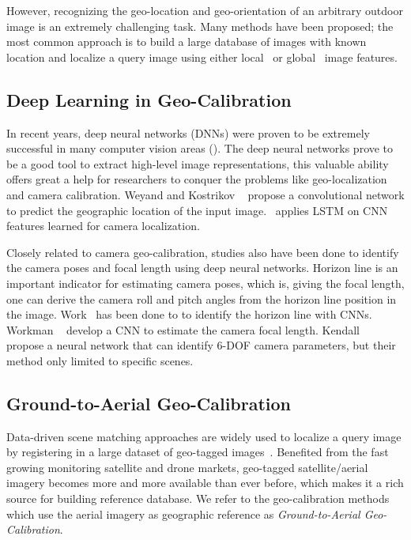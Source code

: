 However, recognizing the geo-location and geo-orientation of an
arbitrary outdoor image is an extremely challenging task.  Many
methods have been proposed; the most common approach is to build a
large database of images with known location and localize a query
image using either local~\cite{li2010location,schindler2008detecting}
or global~\cite{hays2008im2gps,doersch2012what} image features. 


\subsection{Deep Learning in Geo-Calibration}
In recent years, deep neural networks (DNNs) were proven to be
extremely successful in many computer vision areas (). 
The deep neural networks prove to be a good tool to extract high-level
image representations, this valuable ability offers great a help for
researchers to conquer the problems like geo-localization and camera
calibration.
Weyand and Kostrikov \etal~\cite{planet} propose a convolutional
network to predict the geographic location of the input
image.~\cite{walch2017image} applies LSTM on CNN features learned for
camera localization.

Closely related to camera geo-calibration, studies also have been done
to identify the camera poses and focal length using deep neural
networks.
Horizon line is an important indicator for estimating camera poses,
which is, giving the focal length, one can derive the camera roll and
pitch angles from the horizon line position in the image.
Work~\cite{zhai2016horizon, workman2016horizon, hold2017perceptual}
has been done to to identify the horizon line with CNNs.  Workman
\etal~\cite{workman2015deepfocal} develop a CNN to estimate the camera
focal length. Kendall \etal~\cite{kendall2015convolutional} propose a
neural network that can identify 6-DOF camera parameters, but their
method only limited to specific scenes.


\subsection{Ground-to-Aerial Geo-Calibration}
Data-driven scene matching approaches are widely used to localize a
query image by registering in a large dataset of geo-tagged
images~\cite{im2gps, li2010location,zamir2010accurate}.
Benefited from the fast growing monitoring satellite and drone markets,
geo-tagged satellite/aerial imagery becomes more and more available
than ever before, which makes it a rich source for building
reference database. We refer to the geo-calibration methods which use
the aerial imagery as geographic reference as {\em Ground-to-Aerial
Geo-Calibration}.

